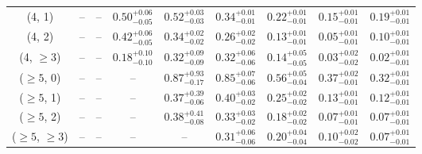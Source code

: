 \begin{table}[h!]
{\begin{tabular}{ccccccccc}
	(4, 1) & -- & -- & $0.50^{+ 0.06 }_{- 0.05 }$ & $0.52^{+ 0.03 }_{- 0.03 }$ & $0.34^{+ 0.01 }_{- 0.01 }$ & $0.22^{+ 0.01 }_{- 0.01 }$ & $0.15^{+ 0.01 }_{- 0.01 }$ & $0.19^{+ 0.01 }_{- 0.01 }$ \\[0.5ex] 
	(4, 2) & -- & -- & $0.42^{+ 0.06 }_{- 0.05 }$ & $0.34^{+ 0.02 }_{- 0.02 }$ & $0.26^{+ 0.02 }_{- 0.02 }$ & $0.13^{+ 0.01 }_{- 0.01 }$ & $0.05^{+ 0.01 }_{- 0.01 }$ & $0.10^{+ 0.01 }_{- 0.01 }$ \\[0.5ex] 
	(4, $\ge3$) & -- & -- & $0.18^{+ 0.10 }_{- 0.10 }$ & $0.32^{+ 0.09 }_{- 0.09 }$ & $0.32^{+ 0.06 }_{- 0.06 }$ & $0.14^{+ 0.05 }_{- 0.05 }$ & $0.03^{+ 0.02 }_{- 0.02 }$ & $0.02^{+ 0.01 }_{- 0.01 }$ \\[0.5ex] 
	($\ge5$, 0) & -- & -- & -- & $0.87^{+ 0.93 }_{- 0.17 }$ & $0.85^{+ 0.07 }_{- 0.06 }$ & $0.56^{+ 0.05 }_{- 0.04 }$ & $0.37^{+ 0.02 }_{- 0.01 }$ & $0.32^{+ 0.01 }_{- 0.01 }$ \\[0.5ex] 
	($\ge5$, 1) & -- & -- & -- & $0.37^{+ 0.39 }_{- 0.06 }$ & $0.40^{+ 0.03 }_{- 0.02 }$ & $0.25^{+ 0.02 }_{- 0.02 }$ & $0.13^{+ 0.01 }_{- 0.01 }$ & $0.12^{+ 0.01 }_{- 0.01 }$ \\[0.5ex] 
	($\ge5$, 2) & -- & -- & -- & $0.38^{+ 0.41 }_{- 0.08 }$ & $0.33^{+ 0.03 }_{- 0.02 }$ & $0.18^{+ 0.02 }_{- 0.02 }$ & $0.07^{+ 0.01 }_{- 0.01 }$ & $0.07^{+ 0.01 }_{- 0.01 }$ \\[0.5ex] 
	($\ge5$, $\ge3$) & -- & -- & -- & -- & $0.31^{+ 0.06 }_{- 0.06 }$ & $0.20^{+ 0.04 }_{- 0.04 }$ & $0.10^{+ 0.02 }_{- 0.02 }$ & $0.07^{+ 0.01 }_{- 0.01 }$ \\[0.5ex] 
	\hline
	\hline
\end{tabular}}
\end{table}
